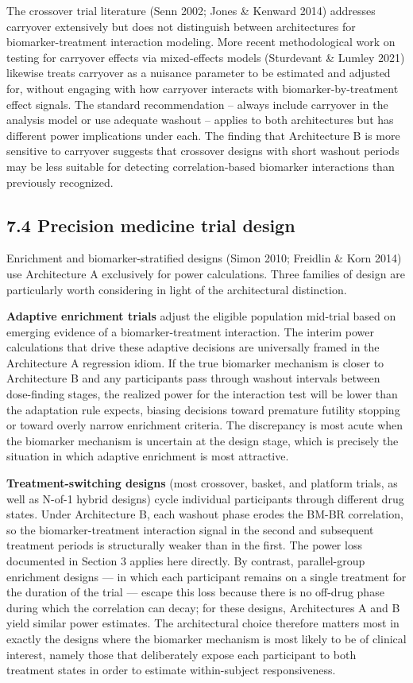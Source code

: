 \documentclass[11pt]{article}
\begin{document}
The crossover trial literature (Senn 2002; Jones \& Kenward
2014) addresses carryover extensively but does not distinguish
between architectures for biomarker-treatment interaction
modeling. More recent methodological work on testing for
carryover effects via mixed-effects models (Sturdevant \& Lumley
2021) likewise treats carryover as a nuisance parameter to be
estimated and adjusted for, without engaging with how carryover
interacts with biomarker-by-treatment effect signals. The
standard recommendation -- always include carryover in the
analysis model or use adequate washout -- applies to both
architectures but has different power implications under each.
The finding that Architecture B is more sensitive to carryover
suggests that crossover designs with short washout periods may
be less suitable for detecting correlation-based biomarker
interactions than previously recognized.

\subsection{7.4 Precision medicine trial design}

Enrichment and biomarker-stratified designs (Simon 2010;
Freidlin \& Korn 2014) use Architecture A exclusively for power
calculations. Three families of design are particularly worth
considering in light of the architectural distinction.

\textbf{Adaptive enrichment trials} adjust the eligible
population mid-trial based on emerging evidence of a
biomarker-treatment interaction. The interim power calculations
that drive these adaptive decisions are universally framed in
the Architecture A regression idiom. If the true biomarker
mechanism is closer to Architecture B and any participants pass
through washout intervals between dose-finding stages, the
realized power for the interaction test will be lower than the
adaptation rule expects, biasing decisions toward premature
futility stopping or toward overly narrow enrichment criteria.
The discrepancy is most acute when the biomarker mechanism is
uncertain at the design stage, which is precisely the situation
in which adaptive enrichment is most attractive.

\textbf{Treatment-switching designs} (most crossover, basket,
and platform trials, as well as N-of-1 hybrid designs) cycle
individual participants through different drug states. Under
Architecture B, each washout phase erodes the BM-BR correlation,
so the biomarker-treatment interaction signal in the second and
subsequent treatment periods is structurally weaker than in the
first. The power loss documented in Section 3 applies here
directly. By contrast, parallel-group enrichment designs --- in
which each participant remains on a single treatment for the
duration of the trial --- escape this loss because there is no
off-drug phase during which the correlation can decay; for
these designs, Architectures A and B yield similar power
estimates. The architectural choice therefore matters most in
exactly the designs where the biomarker mechanism is most
likely to be of clinical interest, namely those that
deliberately expose each participant to both treatment states
in order to estimate within-subject responsiveness.
\end{document}
